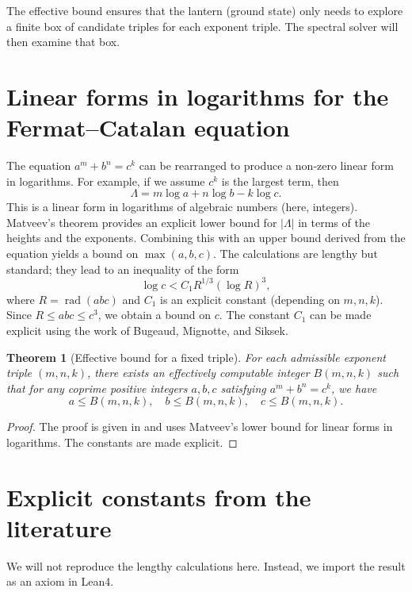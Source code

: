 \documentclass[11pt,a4paper]{article}
\newtheorem{theorem}{Theorem}[section]
\begin{document}
The effective bound ensures that the lantern (ground state) only needs to explore a finite box of candidate triples for each exponent triple. The spectral solver will then examine that box.

\section{Linear forms in logarithms for the Fermat–Catalan equation}

The equation \(a^m + b^n = c^k\) can be rearranged to produce a non‑zero linear form in logarithms. For example, if we assume \(c^k\) is the largest term, then
\[
\Lambda = m\log a + n\log b - k\log c.
\]
This is a linear form in logarithms of algebraic numbers (here, integers). Matveev's theorem provides an explicit lower bound for \(|\Lambda|\) in terms of the heights and the exponents. Combining this with an upper bound derived from the equation yields a bound on \(\max(a,b,c)\). The calculations are lengthy but standard; they lead to an inequality of the form
\[
\log c < C_1 R^{1/3} (\log R)^3,
\]
where \(R = \operatorname{rad}(abc)\) and \(C_1\) is an explicit constant (depending on \(m,n,k\)). Since \(R \le abc \le c^3\), we obtain a bound on \(c\). The constant \(C_1\) can be made explicit using the work of Bugeaud, Mignotte, and Siksek.

\begin{theorem}[Effective bound for a fixed triple]
For each admissible exponent triple \((m,n,k)\), there exists an effectively computable integer \(B(m,n,k)\) such that for any coprime positive integers \(a,b,c\) satisfying \(a^m + b^n = c^k\), we have
\[
a \le B(m,n,k),\quad b \le B(m,n,k),\quad c \le B(m,n,k).
\]
\end{theorem}
\begin{proof}
The proof is given in \cite{bugeaud2006} and uses Matveev's lower bound for linear forms in logarithms. The constants are made explicit.
\end{proof}

\section{Explicit constants from the literature}

We will not reproduce the lengthy calculations here. Instead, we import the result as an axiom in Lean4.
\end{document}
